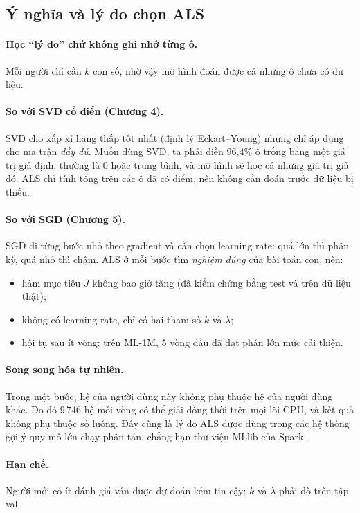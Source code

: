 \subsection{Ý nghĩa và lý do chọn ALS}

\paragraph{Học ``lý do'' chứ không ghi nhớ từng ô.} Mỗi người chỉ cần $k$ con số, nhờ vậy mô hình đoán được
cả những ô chưa có dữ liệu.

\paragraph{So với SVD cổ điển (Chương 4).}
SVD cho xấp xỉ hạng thấp tốt nhất (định lý Eckart--Young) nhưng chỉ áp dụng cho ma trận \emph{đầy đủ}.
Muốn dùng SVD, ta phải điền 96,4\% ô trống bằng một giá trị giả định, thường là 0 hoặc trung bình, và
mô hình sẽ học cả những giá trị giả đó. ALS chỉ tính tổng trên các ô đã có điểm, nên không cần đoán
trước dữ liệu bị thiếu.

\paragraph{So với SGD (Chương 5).}
SGD đi từng bước nhỏ theo gradient và cần chọn learning rate: quá lớn thì phân kỳ, quá nhỏ thì chậm.
ALS ở mỗi bước tìm \emph{nghiệm đúng} của bài toán con, nên:
\begin{itemize}
  \item hàm mục tiêu $J$ không bao giờ tăng (đã kiểm chứng bằng test và trên dữ liệu thật);
  \item không có learning rate, chỉ có hai tham số $k$ và $\lambda$;
  \item hội tụ sau ít vòng: trên ML-1M, 5 vòng đầu đã đạt phần lớn mức cải thiện.
\end{itemize}

\paragraph{Song song hóa tự nhiên.}
Trong một bước, hệ của người dùng này không phụ thuộc hệ của người dùng khác. Do đó $9\,746$ hệ mỗi
vòng có thể giải đồng thời trên mọi lõi CPU, và kết quả không phụ thuộc số luồng. Đây cũng là lý do
ALS được dùng trong các hệ thống gợi ý quy mô lớn chạy phân tán, chẳng hạn thư viện MLlib của Spark.

\paragraph{Hạn chế.} Người mới có ít đánh giá vẫn được dự đoán kém tin cậy; $k$ và $\lambda$ phải dò trên
tập val.

